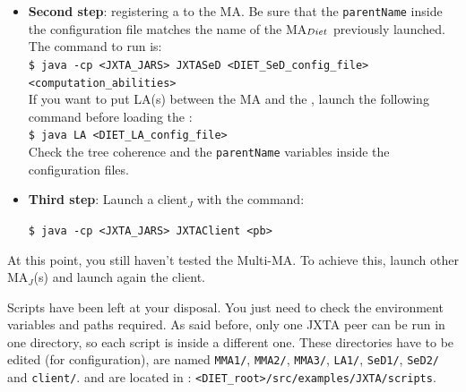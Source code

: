 \begin{itemize}
\item{\textbf{Second step}: registering a \sed to the MA. Be sure that
    the \texttt{parentName} inside the configuration file matches the
    name of the MA$_{{\sc Diet}}$ previously launched. The command to run is:\\
    {\footnotesize \texttt{\$ java -cp <JXTA\_JARS> JXTASeD
        <DIET\_SeD\_config\_file> <computation\_abilities>}
    }\\
    If you want to put LA(s) between the MA and the
    \sed, launch the following command before loading the \sed:\\
    {\footnotesize
      \texttt{\$ java LA <DIET\_LA\_config\_file>}
    }\\ Check the \diet tree coherence and the \texttt{parentName}
    variables inside the configuration files. }
\item{\textbf{Third step}: Launch a client$_{J}$ with the command:\\
    {\footnotesize
      \texttt{\$ java -cp <JXTA\_JARS> JXTAClient <pb>}

   }
 }

  \end{itemize}
  

At this point, you still haven't tested the Multi-MA. To achieve this,
launch other MA$_{J}$(s) and launch again the client.

Scripts have been left at your disposal. You just need to check the
environment variables and paths required. As said before, only one
JXTA peer can be run in one directory, so each script is inside a
different one. These directories have to be edited (for
configuration), are named \texttt{MMA1/}, \texttt{MMA2/},
\texttt{MMA3/}, \texttt{LA1/}, \texttt{SeD1/}, \texttt{SeD2/} and
\texttt{client/}.  and are located in :
\texttt{<DIET\_root>/src/examples/JXTA/scripts}.

